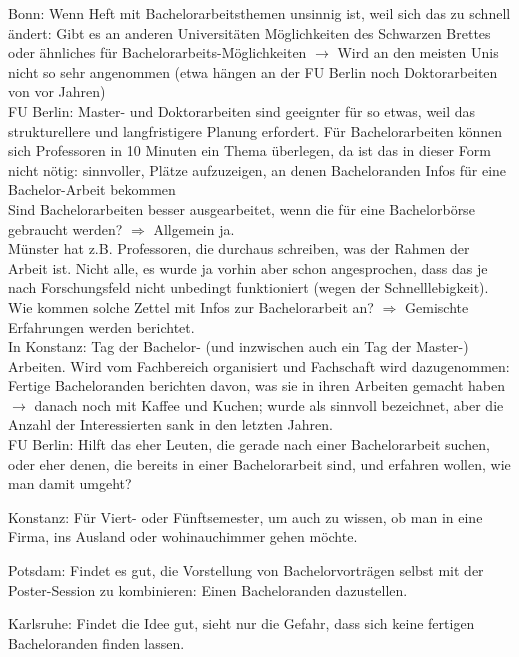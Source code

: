     Bonn: Wenn Heft mit Bachelorarbeitsthemen unsinnig ist, weil sich das zu schnell ändert: Gibt es an anderen Universitäten Möglichkeiten des Schwarzen Brettes oder ähnliches für Bachelorarbeits-Möglichkeiten
    $\rightarrow$ Wird an den meisten Unis nicht so sehr angenommen (etwa hängen an der FU Berlin noch Doktorarbeiten von vor Jahren) \\

    FU Berlin: Master- und Doktorarbeiten sind geeignter für so etwas, weil das strukturellere und langfristigere Planung erfordert. Für Bachelorarbeiten können sich Professoren in 10 Minuten ein Thema überlegen, da ist das in dieser Form nicht nötig: sinnvoller, Plätze aufzuzeigen, an denen Bacheloranden Infos für eine Bachelor-Arbeit bekommen \\

    Sind Bachelorarbeiten besser ausgearbeitet, wenn die für eine Bachelorbörse gebraucht werden?
    $\Rightarrow$ Allgemein ja. \\
    Münster hat z.B. Professoren, die durchaus schreiben, was der Rahmen der Arbeit ist. Nicht alle, es wurde ja vorhin aber schon angesprochen, dass das je nach Forschungsfeld nicht unbedingt funktioniert (wegen der Schnelllebigkeit). \\

    Wie kommen solche Zettel mit Infos zur Bachelorarbeit an? $\Rightarrow$ Gemischte Erfahrungen werden berichtet. \\
    In Konstanz: Tag der Bachelor- (und inzwischen auch ein Tag der Master-) Arbeiten. Wird vom Fachbereich organisiert und Fachschaft wird dazugenommen: Fertige Bacheloranden berichten davon, was sie in ihren Arbeiten gemacht haben $\rightarrow$ danach noch mit Kaffee und Kuchen; wurde als sinnvoll bezeichnet, aber die Anzahl der Interessierten sank in den letzten Jahren. \\

    FU Berlin: Hilft das eher Leuten, die gerade nach einer Bachelorarbeit suchen, oder eher denen, die bereits in einer Bachelorarbeit sind, und erfahren wollen, wie man damit umgeht?

    Konstanz: Für Viert- oder Fünftsemester, um auch zu wissen, ob man in eine Firma, ins Ausland oder wohinauchimmer gehen möchte.

    Potsdam: Findet es gut, die Vorstellung von Bachelorvorträgen selbst mit der Poster-Session zu kombinieren: Einen Bacheloranden dazustellen.

    Karlsruhe: Findet die Idee gut, sieht nur die Gefahr, dass sich keine fertigen Bacheloranden finden lassen.

